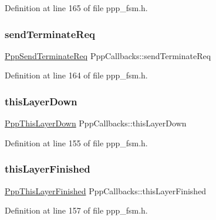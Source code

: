 Definition at line 165 of file ppp\+\_\+fsm.\+h.

\mbox{\label{structPppCallbacks_a0a8578c4f6f59b0db9ffb1f9cd661024}} 
\subsubsection{\texorpdfstring{send\+Terminate\+Req}{sendTerminateReq}}
{\footnotesize\ttfamily \hyperlink{ppp__fsm_8h_a38c40607763e08bb9d1d2fce149c0649}{Ppp\+Send\+Terminate\+Req} Ppp\+Callbacks\+::send\+Terminate\+Req}



Definition at line 164 of file ppp\+\_\+fsm.\+h.

\mbox{\label{structPppCallbacks_a77b3640a9c7e6daae12df2b6912d1777}} 
\subsubsection{\texorpdfstring{this\+Layer\+Down}{thisLayerDown}}
{\footnotesize\ttfamily \hyperlink{ppp__fsm_8h_a85e4e4b76b9c6ee9a9ea183186e2f828}{Ppp\+This\+Layer\+Down} Ppp\+Callbacks\+::this\+Layer\+Down}



Definition at line 155 of file ppp\+\_\+fsm.\+h.

\mbox{\label{structPppCallbacks_a615c0e66746e025074253d4a485c0f49}} 
\subsubsection{\texorpdfstring{this\+Layer\+Finished}{thisLayerFinished}}
{\footnotesize\ttfamily \hyperlink{ppp__fsm_8h_a454f389f6cb679de4cb58f445b01dec8}{Ppp\+This\+Layer\+Finished} Ppp\+Callbacks\+::this\+Layer\+Finished}



Definition at line 157 of file ppp\+\_\+fsm.\+h.

